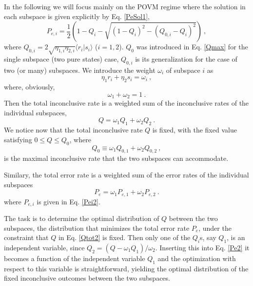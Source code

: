\documentclass[aps,pra,twocolumn,eqsecnum,showpacs]{revtex4}
\begin{document}
In the following we will focus mainly on the POVM regime where the solution in each subspace is given explicitly by Eq. \eqref{PeSol1},
\begin{equation}
P_{e,i} = \frac{1}{2} ( 1 - Q_i - \sqrt{ (1 - Q_i)^2 -(Q_{0,i} - Q_i )^2}) \ ,
\label{Pei2}
\end{equation}
where $Q_{0,i} = 2\sqrt{\eta_{1,i}\eta_{2,i}}\langle r_{i}|s_{i}\rangle$ ($i=1,2$). $Q_{0}$ was introduced in Eq. \eqref{Qmax} for the single subspace (two pure states) case, $Q_{0,i}$
 is its generalization for the case of two (or many) subspaces. We introduce the weight $\omega_{i}$ of subspace $i$ as 
\begin{equation} 
\eta_{1}r_{i} +\eta_{2}s_{i} = \omega_{i} \ ,
\label{omegai}
\end{equation} 
where, obviously, 
\begin{equation}
\omega_{1} + \omega_{2} = 1 \ .
\label{weights}
\end{equation} 
Then the total inconclusive rate is a weighted sum of the inconclusive rates of the individual subspaces, 
\begin{equation}
Q = \omega_{1} Q_{1} + \omega_{2} Q_{2} \ .
\label{Qtot2}
\end{equation}
We notice now that the total inconclusive rate $Q$ is fixed, with the fixed value satisfying $0 \leq Q \leq Q_{0}$, where
\begin{equation}
Q_{0} \equiv \omega_{1}Q_{0,1} + \omega_{2} Q_{0,2} \ , 
\label{Q0}
\end{equation}
is the maximal inconclusive rate that the two subspaces can accommodate.

Similary, the total error rate is a weighted sum of the error rates of the individual subspaces
\begin{equation}
P_{e} = \omega_{1} P_{e,1} + \omega_{2} P_{e,2} \ .
\label{Pe2}
\end{equation}
where $P_{e,i}$ is given in Eq. \eqref{Pei2}.


The task is to determine the optimal distribution of $Q$ between the two subspaces, the distribution that minimizes the total error rate $P_{e}$, under the constraint that $Q$ in Eq. \eqref{Qtot2} is fixed. 
Then only one of the $Q_{i}$s, say $Q_{1}$, is an independent variable, since $Q_{2} = (Q - \omega_{1} Q_{1})/\omega_{2}$. Inserting this into Eq. \eqref{Pe2} it becomes a function of the independent variable $Q_{1}$ and the optimization with respect to this variable is straightforward, yielding the optimal distribution of the fixed inconclusive outcomes between the two subspaces. 
\end{document}
